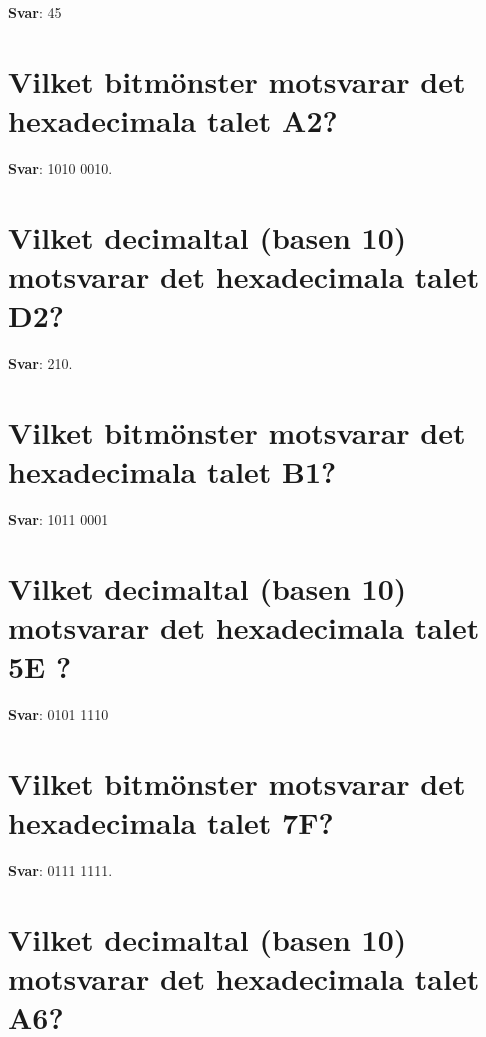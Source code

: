 \documentclass[a4paper,11pt,oneside]{book}
\begin{document}
\begin{sloppypar}
\label{q:395:sa:sv:True}

\textbf{Svar}: 45



\section{Vilket bitm\"onster motsvarar det hexadecimala talet A2?}

\label{q:396:sa:sv:True}

\textbf{Svar}: 1010 0010.



\section{Vilket decimaltal (basen 10) motsvarar det hexadecimala talet D2?}

\label{q:397:sa:sv:True}

\textbf{Svar}: 210.



\section{Vilket bitm\"onster motsvarar det hexadecimala talet B1?}

\label{q:398:sa:sv:True}

\textbf{Svar}: 1011 0001



\section{Vilket decimaltal (basen 10) motsvarar det hexadecimala talet 5E ?}

\label{q:399:sa:sv:True}

\textbf{Svar}: 0101 1110



\section{Vilket bitm\"onster motsvarar det hexadecimala talet 7F?}

\label{q:400:sa:sv:True}

\textbf{Svar}: 0111 1111.



\section{Vilket decimaltal (basen 10) motsvarar det hexadecimala talet A6?}


\end{sloppypar}
\end{document}
